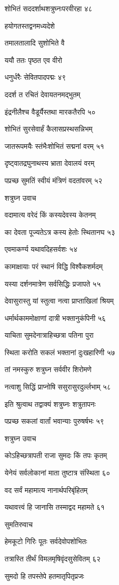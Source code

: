 शोभितं सददर्शाथशत्रुघ्नःपरवीरहा ४८

हयोगतस्तद्वनमध्यदेशे

तमालतालादि सुशोभिते वै

ययौ ततः पृष्ठत एव वीरो

धनुर्धरैः सेवितपादपद्मः ४९

ददर्श त रचितं देवायतनमद्भुतम्

इंद्रनीलैश्च वैडूर्यैस्तथा मारकतैरपि ५०

शोभितं सुरसेवार्हं कैलासप्रस्थसन्निभम्

जातरूपमयैः स्तंभैःशोभितं सद्मनां वरम् ५१

दृष्ट्वातद्रघुनाथस्य भ्राता देवालयं वरम्

पप्रच्छ सुमतिं स्वीयं मंत्रिणं वदतांवरम् ५२

शत्रुघ्न उवाच

वदामात्य वरेदं किं कस्यदेवस्य केतनम्

का देवता पूज्यतेऽत्र कस्य हेतोः स्थितानघ ५३

एवमाकर्ण्य यथावदिहसर्वशः ५४

कामाक्षायाः परं स्थानं विद्धि विश्वैकशर्मदम्

यस्या दर्शनमात्रेण सर्वसिद्धिः प्रजापते ५५

देवासुरास्तु यां स्तुत्वा नत्वा प्राप्ताखिलां श्रियम्

धर्मार्थकाममोक्षाणां दात्री भक्तानुकंपिनी ५६

याचिता सुमदेनात्राहिच्छत्रा पतिना पुरा

स्थिता करोति सकलं भक्तानां दुःखहारिणी ५७

तां नमस्कुरु शत्रुघ्न सर्ववीर शिरोमणे

नत्वाशु सिद्धिं प्राप्नोषि ससुरासुरदुर्ल्लभाम् ५८

इति श्रुत्वाथ तद्वाक्यं शत्रुघ्नः शत्रुतापनः

पप्रच्छ सकलां वार्तां भवान्याः पुरुषर्षभः ५९

शत्रुघ्न उवाच

कोऽहिच्छत्रापती राजा सुमदः किं तपः कृतम्

येनेयं सर्वलोकानां माता तुष्टात्र संस्थिता ६०

वद सर्वं महामात्य नानार्थपरिबृंहितम्

यथावत्त्वं हि जानासि तस्माद्वद महामते ६१

सुमतिरुवाच

हेमकूटो गिरिः पूतः सर्वदेवोपशोभितः

तत्रास्ति तीर्थं विमलमृषिवृंदसुसेवितम् ६२

सुमदो हि तपस्तेपे हतमातृपितृप्रजः

